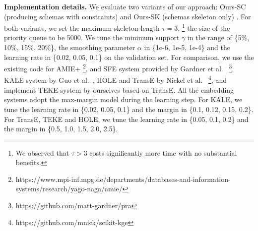\noindent
\textbf{Implementation details.}
We evaluate two variants of our approach: Ours-SC (producing schemas with constraints)
and Ours-SK (schemas skeleton only) .
For both variants,
we set the maximum skeleton length $\tau = 3$,
\footnote{
We observed that $\tau > 3$ costs significantly more time with no
substantial benefits.}
the size of the priority queue to be 5000.
We tune the minimum support $\gamma$ in the range of \{5\%, 10\%, 15\%, 20\%\},
the smoothing parameter $\alpha$ in \{1e-6, 1e-5, 1e-4\}
and the learning rate in \{0.02, 0.05, 0.1\} on the validation set.
For comparison, we use the existing code for
AMIE+ \footnote{https://www.mpi-inf.mpg.de/departments/databases-and-information-systems/research/yago-naga/amie/},
and SFE system provided by Gardner et al.~
\footnote{https://github.com/matt-gardner/pra},
KALE system by Guo et al.~,
HOLE and TransE by Nickel et al.~
\footnote{https://github.com/mnick/scikit-kge},
and implement TEKE system by ourselves based on TransE.
All the embedding systems adopt the max-margin model during the learning step.
For KALE, we tune the learning rate in \{0.02, 0.05, 0.1\} and the margin
in \{0.1, 0.12, 0.15, 0.2\}.
For TransE, TEKE and HOLE, we tune the learning rate in \{0.05, 0.1, 0.2\} and the margin
in \{0.5, 1.0, 1.5, 2.0, 2.5\}.


